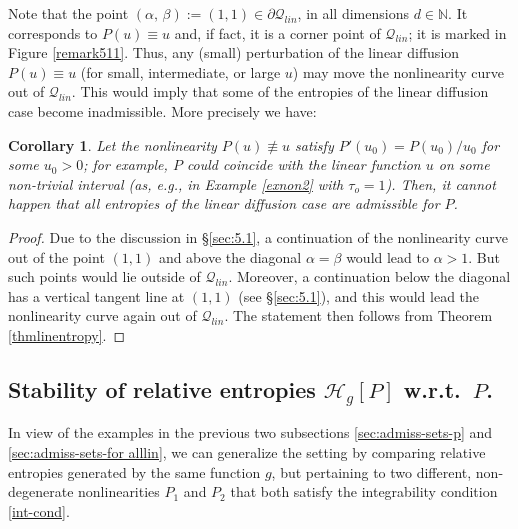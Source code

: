 \documentclass[reqno]{amsart}
\newtheorem{corollary}[lemma]{Corollary}
\newcommand{\N}{\mathbb{N}}
\renewcommand{\H}{{\mathcal{H}}}
\begin{document}
Note that the point $(\alpha,\,\beta):=(1,1)\in\partial\mathcal Q_{lin}$, in all dimensions $d\in\N$. It corresponds to $P(u)\equiv u$ and, if fact, it is a corner point of $\mathcal Q_{lin}$; it is marked in Figure \ref{remark511}. Thus, any (small) perturbation of the linear diffusion $P(u)\equiv u$ (for small, intermediate, or large $u$) may move the nonlinearity curve out of $\mathcal Q_{lin}$. This would imply that some of the entropies of the linear diffusion case become inadmissible. More precisely we have:
\begin{corollary}
    Let the nonlinearity $P(u)\not\equiv u$ satisfy $P'(u_0)=P(u_0)/u_0$ for some $u_0>0$; for example, $P$ could coincide with the linear function $u$ on some non-trivial interval (as, e.g., in Example \ref{exnon2} with $\tau_o=1$). Then, it cannot happen that \emph{all} entropies of the linear diffusion case are admissible for $P$.
\end{corollary}
\begin{proof}
Due to the discussion in \S\ref{sec:5.1}, a continuation of the nonlinearity curve out of the point $(1,1)$ and above the diagonal $\alpha=\beta$ would lead to $\alpha>1$. But such points would lie outside of $\mathcal Q_{lin}$. Moreover, a continuation below the diagonal has a vertical tangent line at $(1,1)$ (see \S\ref{sec:5.1}), and this would lead the nonlinearity curve again out of $\mathcal Q_{lin}$. The statement then follows from Theorem \ref{thmlinentropy}.
\end{proof}


\subsection{Stability of relative entropies $\H_g[P]$ w.r.t.\ $P$.}\label{Sec:stability}
In view of the examples in the previous two subsections \ref{sec:admiss-sets-p} and \ref{sec:admiss-sets-for alllin}, we can generalize the setting
by comparing relative entropies generated by the same function $g$, but pertaining to two different, non-degenerate nonlinearities $P_1$ and $P_2$ that both satisfy the integrability condition \eqref{int-cond}.
\end{document}
